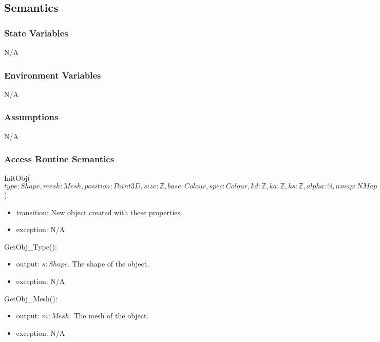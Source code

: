 \documentclass[12pt, titlepage]{article}
\begin{document}
\subsection{Semantics}
\subsubsection{State Variables}
N/A

\subsubsection{Environment Variables}
N/A

\subsubsection{Assumptions}
N/A

\subsubsection{Access Routine Semantics}
\noindent InitObj($type: Shape, mesh: Mesh, position : Point3D, size : 
\mathbb{Z},  
base : Colour, spec : Colour, kd : \mathbb{Z}, ka : \mathbb{Z}, ks : 
\mathbb{Z}, alpha : \mathbb{N}, nmap : NMap $):
\begin{itemize}
	\item transition: New object created with these properties. 
	\item exception: N/A
\end{itemize}

\noindent GetObj\_Type():
\begin{itemize}
\item output: $s : Shape$. The shape of the object.
\item exception: N/A
\end{itemize}

\noindent GetObj\_Mesh():
\begin{itemize}
	\item output: $m : Mesh$. The mesh of the object.
	\item exception: N/A
\end{itemize}
\end{document}
